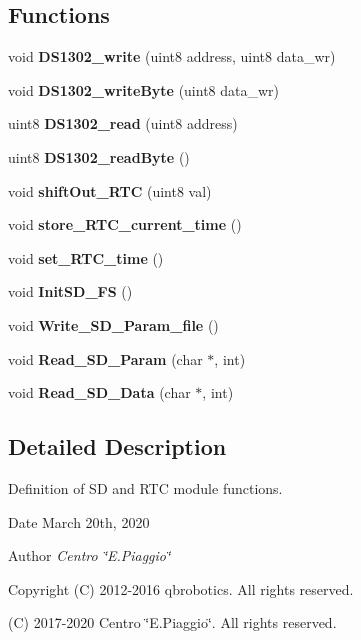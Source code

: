 \subsection*{Functions}
\begin{DoxyCompactItemize}
\item 
\mbox{\label{_s_d___r_t_c__functions_8h_ae916e48139e2369b4295bc32b754cb09}} 
void {\bfseries D\+S1302\+\_\+write} (uint8 address, uint8 data\+\_\+wr)
\item 
\mbox{\label{_s_d___r_t_c__functions_8h_abf7dafb7cb2decd885c06cfd0d508a86}} 
void {\bfseries D\+S1302\+\_\+write\+Byte} (uint8 data\+\_\+wr)
\item 
\mbox{\label{_s_d___r_t_c__functions_8h_a648ecf3d4f3a92e6390945b156d5c98a}} 
uint8 {\bfseries D\+S1302\+\_\+read} (uint8 address)
\item 
\mbox{\label{_s_d___r_t_c__functions_8h_a961280caa20d802239a974419c19437e}} 
uint8 {\bfseries D\+S1302\+\_\+read\+Byte} ()
\item 
\mbox{\label{_s_d___r_t_c__functions_8h_a1f5533e91998b92926173f479322c7d9}} 
void {\bfseries shift\+Out\+\_\+\+R\+TC} (uint8 val)
\item 
\mbox{\label{_s_d___r_t_c__functions_8h_a262170705e582875a383a9f5c9b137a7}} 
void {\bfseries store\+\_\+\+R\+T\+C\+\_\+current\+\_\+time} ()
\item 
\mbox{\label{_s_d___r_t_c__functions_8h_ad0181162f59bf423c6d1dc1556afb6fc}} 
void {\bfseries set\+\_\+\+R\+T\+C\+\_\+time} ()
\item 
\mbox{\label{_s_d___r_t_c__functions_8h_a56466454f41dc875787a75f0d78b5602}} 
void {\bfseries Init\+S\+D\+\_\+\+FS} ()
\item 
\mbox{\label{_s_d___r_t_c__functions_8h_a5072914b0c92c6825bb196ba84b332c4}} 
void {\bfseries Write\+\_\+\+S\+D\+\_\+\+Param\+\_\+file} ()
\item 
\mbox{\label{_s_d___r_t_c__functions_8h_ab859160c1aaa93a7acab54f21be69c1c}} 
void {\bfseries Read\+\_\+\+S\+D\+\_\+\+Param} (char $\ast$, int)
\item 
\mbox{\label{_s_d___r_t_c__functions_8h_a629e87adeb558dd2c752a3b5712af3ed}} 
void {\bfseries Read\+\_\+\+S\+D\+\_\+\+Data} (char $\ast$, int)
\end{DoxyCompactItemize}


\subsection{Detailed Description}
Definition of SD and R\+TC module functions. 

\begin{DoxyDate}{Date}
March 20th, 2020 
\end{DoxyDate}
\begin{DoxyAuthor}{Author}
{\itshape Centro \char`\"{}\+E.\+Piaggio\char`\"{}} 
\end{DoxyAuthor}
\begin{DoxyCopyright}{Copyright}
(C) 2012-\/2016 qbrobotics. All rights reserved. 

(C) 2017-\/2020 Centro \char`\"{}\+E.\+Piaggio\char`\"{}. All rights reserved. 
\end{DoxyCopyright}
